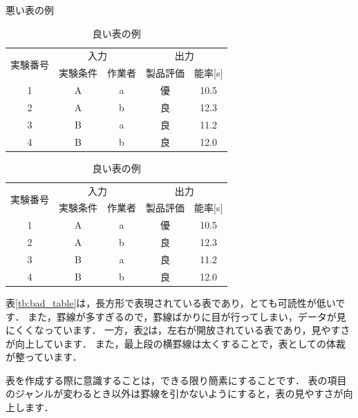 \documentclass{jarticle}
\begin{document}
\begin{table}[H]
  \begin{minipage}[t]{.45\textwidth}
    \caption{悪い表の例}
    \begin{center}
      \begin{tabular}{|c|c|c|c|c|}\hline
        \multirow{2}{*}{実験番号} & \multicolumn{2}{c}{入力} & \multicolumn{2}{c|}{出力}\\ \cline{2-5}
        & 実験条件 & 作業者 & 製品評価 & 能率[s] \\ \hline
        1 & A & a & 優 & 10.5 \\\hline
        2 & A & b & 良 & 12.3 \\\hline
        3 & B & a & 良 & 11.2 \\\hline
        4 & B & b & 良 & 12.0 \\\hline
      \end{tabular}
    \end{center}
    \label{tb:bad_table}
  \end{minipage}
  \hfill
  \begin{minipage}[t]{.45\textwidth}
    \caption{良い表の例}
    \begin{center}
      \begin{tabular}{c|cc|cc}\toprule
        \multirow{2}{*}{実験番号} & \multicolumn{2}{c|}{入力} & \multicolumn{2}{c}{出力}\\
        & 実験条件 & 作業者 & 製品評価 & 能率[s] \\ \hline
        1 & A & a & 優 & 10.5 \\
        2 & A & b & 良 & 12.3 \\
        3 & B & a & 良 & 11.2 \\
        4 & B & b & 良 & 12.0 \\\hline
      \end{tabular}
    \end{center}
    \label{tb:good_table}
  \end{minipage}

\end{table}

表\ref{tb:bad_table}は，長方形で表現されている表であり，とても可読性が低いです．
また，罫線が多すぎるので，罫線ばかりに目が行ってしまい，データが見にくくなっています．
一方，表\ref{tb:good_table}は，左右が開放されている表であり，見やすさが向上しています．
また，最上段の横罫線は太くすることで，表としての体裁が整っています．

表を作成する際に意識することは，できる限り簡素にすることです．
表の項目のジャンルが変わるとき以外は罫線を引かないようにすると，表の見やすさが向上します．
\end{document}
